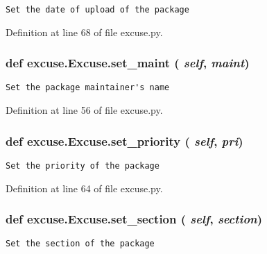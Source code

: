 \footnotesize\begin{verbatim}Set the date of upload of the package\end{verbatim}
\normalsize
 

Definition at line 68 of file excuse.py.
\subsubsection{\setlength{\rightskip}{0pt plus 5cm}def excuse.Excuse.set\_\-maint ( {\em self},  {\em maint})}\label{classexcuse_1_1Excuse_189ec1709eef0bd8acb9cd093b8350b5}




\footnotesize\begin{verbatim}Set the package maintainer's name\end{verbatim}
\normalsize
 

Definition at line 56 of file excuse.py.
\subsubsection{\setlength{\rightskip}{0pt plus 5cm}def excuse.Excuse.set\_\-priority ( {\em self},  {\em pri})}\label{classexcuse_1_1Excuse_3a0ebe3eb87c1af8f093e80a874ea0fa}




\footnotesize\begin{verbatim}Set the priority of the package\end{verbatim}
\normalsize
 

Definition at line 64 of file excuse.py.
\subsubsection{\setlength{\rightskip}{0pt plus 5cm}def excuse.Excuse.set\_\-section ( {\em self},  {\em section})}\label{classexcuse_1_1Excuse_6b435fa4d19b929d9fb70c8d28688387}




\footnotesize\begin{verbatim}Set the section of the package\end{verbatim}
\normalsize
 

